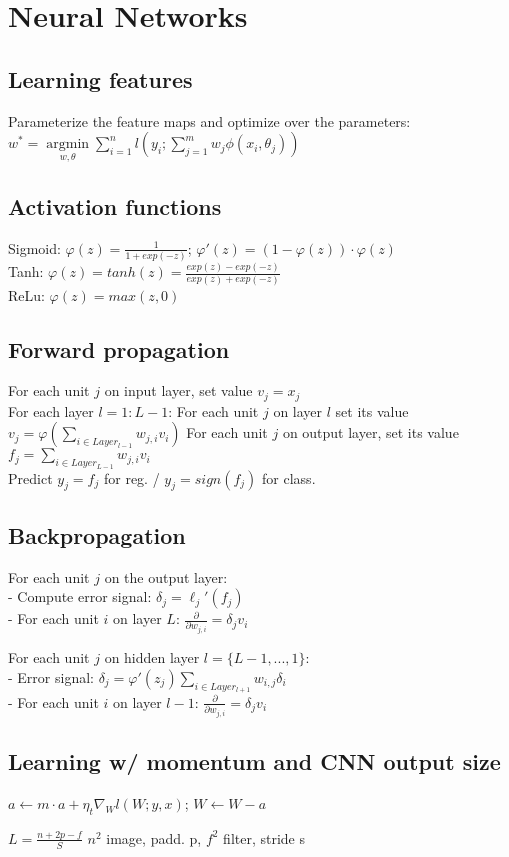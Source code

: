 \section*{Neural Networks}
\subsection*{Learning features}
Parameterize the feature maps and optimize over the parameters:\\
$w^* = \underset{w, \theta}{\operatorname{argmin}} \sum_{i=1}^n l(y_i; \sum_{j=1}^m w_j \phi(x_i, \theta_j))$\\

\subsection*{Activation functions}
Sigmoid: $\varphi(z) = \frac{1}{1+exp(-z)}$;  $\varphi'(z) = (1 - \varphi(z))\cdot\varphi(z)$\\
Tanh: $\varphi(z) = tanh(z) = \frac{exp(z)-exp(-z)}{exp(z)+exp(-z)}$\\
ReLu:  $\varphi(z) = max(z,0)$

\subsection*{Forward propagation}
For each unit $j$ on input layer, set value $v_j=x_j$\\
For each layer $l=1:L-1$: For each unit $j$ on layer $l$ set its value $v_j = \varphi(\sum_{i\in Layer_{l-1}} w_{j,i}v_i)$
For each unit $j$ on output layer, set its value $f_j = \sum_{i\in Layer_{L-1}} w_{j,i}v_i$\\
Predict $y_j = f_j$ for reg. / $y_j = sign(f_j)$ for class.

\subsection*{Backpropagation}
For each unit $j$ on the output layer:\\
- Compute error signal: $\delta_j = \ell_j'(f_j)$\\
- For each unit $i$ on layer $L$: $\frac{\partial}{\partial w_{j,i}} = \delta_j v_i$

For each unit $j$ on hidden layer $l=\{L-1,...,1\}$:\\
- Error signal: $\delta_j = \varphi'(z_j) \sum_{i\in Layer_{l+1}} w_{i,j}\delta_i$\\
- For each unit $i$ on layer $l-1$: $\frac{\partial}{\partial w_{j,i}} = \delta_j v_i$

\subsection*{Learning w/ momentum and CNN output size}
$a \leftarrow m \cdot a + \eta_t \nabla_W l(W;y,x)$; $W \leftarrow W - a$

$L=\frac{n+2p-f}{S}$ $n^2$ image, padd. p, $f^2$ filter, stride s
